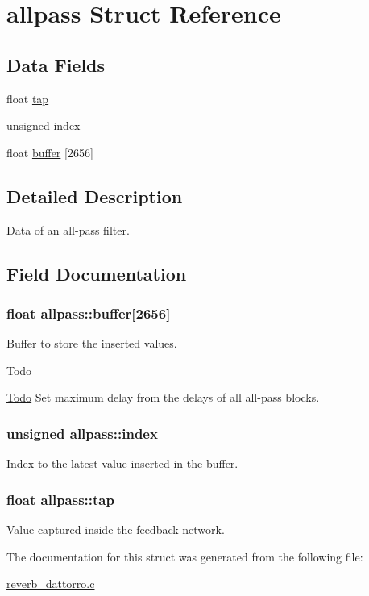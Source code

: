 \hypertarget{structallpass}{\section{allpass Struct Reference}
\label{structallpass}
}
\subsection*{Data Fields}
\begin{DoxyCompactItemize}
\item 
float \hyperlink{structallpass_a386c2fb3676a8b9eb006427d14df5589}{tap}
\item 
unsigned \hyperlink{structallpass_a03c8893e240b738a3881026d1433930e}{index}
\item 
float \hyperlink{structallpass_a9a88e7125eb10d734a1a408c26cebe49}{buffer} \mbox{[}2656\mbox{]}
\end{DoxyCompactItemize}


\subsection{Detailed Description}
Data of an all-\/pass filter. 

\subsection{Field Documentation}
\hypertarget{structallpass_a9a88e7125eb10d734a1a408c26cebe49}{
\subsubsection[{buffer}]{\setlength{\rightskip}{0pt plus 5cm}float allpass\-::buffer\mbox{[}2656\mbox{]}}}\label{structallpass_a9a88e7125eb10d734a1a408c26cebe49}
Buffer to store the inserted values. \begin{DoxyRefDesc}{Todo}
\item[\hyperlink{todo__todo000015}{Todo}]Set maximum delay from the delays of all all-\/pass blocks. \end{DoxyRefDesc}
\hypertarget{structallpass_a03c8893e240b738a3881026d1433930e}{
\subsubsection[{index}]{\setlength{\rightskip}{0pt plus 5cm}unsigned allpass\-::index}}\label{structallpass_a03c8893e240b738a3881026d1433930e}
Index to the latest value inserted in the buffer. \hypertarget{structallpass_a386c2fb3676a8b9eb006427d14df5589}{
\subsubsection[{tap}]{\setlength{\rightskip}{0pt plus 5cm}float allpass\-::tap}}\label{structallpass_a386c2fb3676a8b9eb006427d14df5589}
Value captured inside the feedback network. 

The documentation for this struct was generated from the following file\-:\begin{DoxyCompactItemize}
\item 
\hyperlink{reverb__dattorro_8c}{reverb\-\_\-dattorro.\-c}\end{DoxyCompactItemize}
